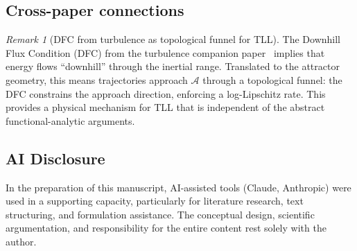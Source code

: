 \documentclass[12pt,a4paper]{article}
\theoremstyle{definition}
\theoremstyle{plain}
\theoremstyle{remark}
\newtheorem{remark}[definition]{Remark}
\begin{document}
\subsection{Cross-paper connections}

\begin{remark}[DFC from turbulence as topological funnel for TLL]
\label{rem:dfc-funnel}
The Downhill Flux Condition (DFC) from the turbulence companion paper~\cite{FST-NS2026} implies that energy flows ``downhill'' through the inertial range. Translated to the attractor geometry, this means trajectories approach $\mathcal{A}$ through a topological funnel: the DFC constrains the approach direction, enforcing a log-Lipschitz rate. This provides a physical mechanism for TLL that is independent of the abstract functional-analytic arguments.
\end{remark}


\subsection*{AI Disclosure}
In the preparation of this manuscript, AI-assisted tools (Claude, Anthropic)
were used in a supporting capacity, particularly for literature research,
text structuring, and formulation assistance.  The conceptual design,
scientific argumentation, and responsibility for the entire content
rest solely with the author.
\end{document}
